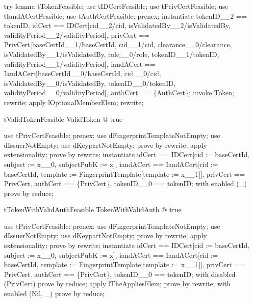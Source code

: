 try lemma tTokenFeasible;
use tIDCertFeasible;
use tPrivCertFeasible;
use tIandACertFeasible;
use tAuthCertFeasible;
prenex;
instantiate
  tokenID\_\_2 == tokenID,
  idCert
    == \theta
         IDCert[cid\_\_2/cid, isValidatedBy\_\_2/isValidatedBy,
                validityPeriod\_\_2/validityPeriod],
  privCert
    == \theta
         PrivCert[baseCertId\_\_1/baseCertId, cid\_\_1/cid,
                  clearance\_\_0/clearance, isValidatedBy\_\_1/isValidatedBy,
                  role\_\_0/role, tokenID\_\_1/tokenID,
                  validityPeriod\_\_1/validityPeriod],
  iandACert
    == \theta
         IandACert[baseCertId\_\_0/baseCertId, cid\_\_0/cid,
                   isValidatedBy\_\_0/isValidatedBy, tokenID\_\_0/tokenID,
                   validityPeriod\_\_0/validityPeriod],
  authCert == \{\theta AuthCert\};
invoke Token;
rewrite;
apply lOptionalMemberElem;
rewrite;

\begin{theorem}{tValidTokenFeasible}
\exists  ValidToken @ true
\end{theorem}

\begin{zproof}[tValidTokenFeasible]
use tPrivCertFeasible;
prenex;
use dFingerprintTemplateNotEmpty;
use dIssuerNotEmpty;
use dKeypartNotEmpty;
prove by rewrite;
apply extensionality;
prove by rewrite;
instantiate
  idCert
    == \theta IDCert[cid := baseCertId, subject := x\_\_0, subjectPubK := x],
  iandACert
    == \theta
         IandACert[cid := baseCertId,
                   template := \theta FingerprintTemplate[template := x\_\_1]],
  privCert == \theta PrivCert, authCert == \{\theta PrivCert\},
  tokenID\_\_0 == tokenID;
with enabled (\Optional \_) prove by reduce;
\end{zproof}

\begin{theorem}{tTokenWithValidAuthFeasible}
\exists  TokenWithValidAuth @ true
\end{theorem}

\begin{zproof}[tTokenWithValidAuthFeasible]
use tPrivCertFeasible;
prenex;
use dFingerprintTemplateNotEmpty;
use dIssuerNotEmpty;
use dKeypartNotEmpty;
prove by rewrite;
apply extensionality;
prove by rewrite;
instantiate
  idCert
    == \theta IDCert[cid := baseCertId, subject := x\_\_0, subjectPubK := x],
  iandACert
    == \theta
         IandACert[cid := baseCertId,
                   template := \theta FingerprintTemplate[template := x\_\_1]],
  privCert == \theta PrivCert, authCert == \{\theta PrivCert\},
  tokenID\_\_0 == tokenID;
with disabled (PrivCert) prove by reduce;
apply lTheAppliesElem;
prove by rewrite;
with enabled (Nil, \Optional \_) prove by reduce;
\end{zproof}

